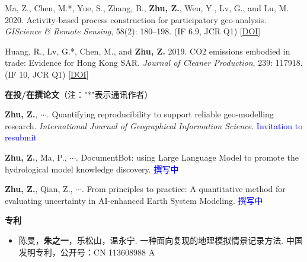 \documentclass[a4paper,11pt]{article}
\begin{document}
\begin{etaremune}[leftmargin=0.3in]
    \vspace{1pt} \item Ma, Z., Chen, M.*, Yue, S., Zhang, B., \textbf{Zhu, Z.}, Wen, Y., Lv, G., and Lu, M. 2020. Activity-based process construction for participatory geo-analysis. \textit{GIScience \& Remote Sensing}, 58(2): 180--198. (IF 6.9, JCR Q1) [\href{https://doi.org/10.1080/15481603.2020.1868211}{DOI}]

     \vspace{1pt} \item Huang, R., Lv, G.*, Chen, M., and \textbf{Zhu, Z.} 2019. CO2 emissions embodied in trade: Evidence for Hong Kong SAR. \textit{Journal of Cleaner Production}, 239: 117918. (IF 10, JCR Q1) [\href{https://doi.org/10.1016/j.jclepro.2019.117918}{DOI}]
\end{etaremune}
\vspace{5pt}

\hspace{0.1in}\textbf{在投/在撰论文}（注："*"表示通讯作者）
\begin{etaremune}[leftmargin=0.3in]
    \vspace{1pt} \item \textbf{Zhu, Z.}, $\cdots$. Quantifying reproducibility to support reliable geo-modelling research. \textit{International Journal of Geographical Information Science}. \textcolor{blue}{Invitation to resubmit}
    \vspace{1pt} \item \textbf{Zhu, Z.}, Ma, P., $\cdots$. DocumentBot: using Large Language Model to promote the hydrological model knowledge discovery. \textcolor{blue}{撰写中}
    \vspace{1pt} \item \textbf{Zhu, Z.}, Qian, Z., $\cdots$. From principles to practice: A quantitative method for evaluating uncertainty in AI-enhanced Earth System Modeling. \textcolor{blue}{撰写中}
\end{etaremune}
\vspace{3pt}

\hspace{0.1in}\textbf{专利}
\begin{itemize}[leftmargin=0.3in,label={$\bullet$}]
    \vspace{1pt} \item 陈旻，\textbf{朱之一}，乐松山，温永宁. 一种面向复现的地理模拟情景记录方法. 中国发明专利，公开号：CN 113608988 A
\end{itemize}

\end{document}
